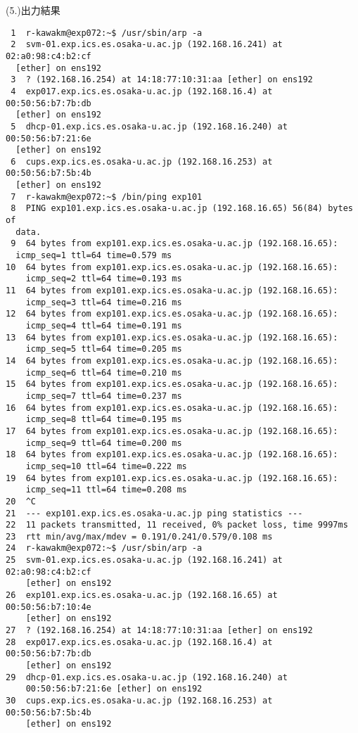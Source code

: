 \documentclass[a4j]{jarticle}
\newenvironment{bit}{\begin{breakitembox}}{\end{breakitembox}} %
\begin{document}
\begin{bit}[l]{(5.)出力結果}
\small{
\begin{verbatim}
 1	r-kawakm@exp072:~$ /usr/sbin/arp -a
 2	svm-01.exp.ics.es.osaka-u.ac.jp (192.168.16.241) at 02:a0:98:c4:b2:cf
  [ether] on ens192
 3	? (192.168.16.254) at 14:18:77:10:31:aa [ether] on ens192
 4	exp017.exp.ics.es.osaka-u.ac.jp (192.168.16.4) at 00:50:56:b7:7b:db
  [ether] on ens192
 5	dhcp-01.exp.ics.es.osaka-u.ac.jp (192.168.16.240) at 00:50:56:b7:21:6e
  [ether] on ens192
 6	cups.exp.ics.es.osaka-u.ac.jp (192.168.16.253) at 00:50:56:b7:5b:4b
  [ether] on ens192
 7	r-kawakm@exp072:~$ /bin/ping exp101
 8	PING exp101.exp.ics.es.osaka-u.ac.jp (192.168.16.65) 56(84) bytes of
  data.
 9	64 bytes from exp101.exp.ics.es.osaka-u.ac.jp (192.168.16.65):
  icmp_seq=1 ttl=64 time=0.579 ms
10	64 bytes from exp101.exp.ics.es.osaka-u.ac.jp (192.168.16.65):
    icmp_seq=2 ttl=64 time=0.193 ms
11	64 bytes from exp101.exp.ics.es.osaka-u.ac.jp (192.168.16.65):
    icmp_seq=3 ttl=64 time=0.216 ms
12	64 bytes from exp101.exp.ics.es.osaka-u.ac.jp (192.168.16.65):
    icmp_seq=4 ttl=64 time=0.191 ms
13	64 bytes from exp101.exp.ics.es.osaka-u.ac.jp (192.168.16.65):
    icmp_seq=5 ttl=64 time=0.205 ms
14	64 bytes from exp101.exp.ics.es.osaka-u.ac.jp (192.168.16.65):
    icmp_seq=6 ttl=64 time=0.210 ms
15	64 bytes from exp101.exp.ics.es.osaka-u.ac.jp (192.168.16.65):
    icmp_seq=7 ttl=64 time=0.237 ms
16	64 bytes from exp101.exp.ics.es.osaka-u.ac.jp (192.168.16.65):
    icmp_seq=8 ttl=64 time=0.195 ms
17	64 bytes from exp101.exp.ics.es.osaka-u.ac.jp (192.168.16.65):
    icmp_seq=9 ttl=64 time=0.200 ms
18	64 bytes from exp101.exp.ics.es.osaka-u.ac.jp (192.168.16.65):
    icmp_seq=10 ttl=64 time=0.222 ms
19	64 bytes from exp101.exp.ics.es.osaka-u.ac.jp (192.168.16.65):
    icmp_seq=11 ttl=64 time=0.208 ms
20	^C
21	--- exp101.exp.ics.es.osaka-u.ac.jp ping statistics ---
22	11 packets transmitted, 11 received, 0% packet loss, time 9997ms
23	rtt min/avg/max/mdev = 0.191/0.241/0.579/0.108 ms
24	r-kawakm@exp072:~$ /usr/sbin/arp -a
25	svm-01.exp.ics.es.osaka-u.ac.jp (192.168.16.241) at 02:a0:98:c4:b2:cf
    [ether] on ens192
26	exp101.exp.ics.es.osaka-u.ac.jp (192.168.16.65) at 00:50:56:b7:10:4e
    [ether] on ens192
27	? (192.168.16.254) at 14:18:77:10:31:aa [ether] on ens192
28	exp017.exp.ics.es.osaka-u.ac.jp (192.168.16.4) at 00:50:56:b7:7b:db
    [ether] on ens192
29	dhcp-01.exp.ics.es.osaka-u.ac.jp (192.168.16.240) at
    00:50:56:b7:21:6e [ether] on ens192
30	cups.exp.ics.es.osaka-u.ac.jp (192.168.16.253) at 00:50:56:b7:5b:4b
    [ether] on ens192
\end{verbatim}
}
\end{bit}
\end{document}
